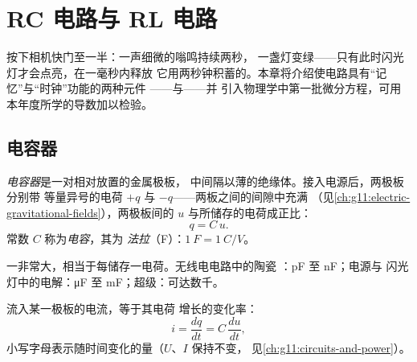 \chapter{RC 电路与 RL 电路}\label{ch:g12:rc-rl-circuits}

按下相机快门至一半：一声细微的嗡鸣持续两秒，
一盏灯变绿——只有此时闪光灯才会点亮，在一毫秒内释放
它用两秒钟积蓄的。本章将介绍使电路具有“记忆”与“时钟”功能的两种元件
——与——并
引入物理学中第一批微分方程，可用本年度所学的导数加以检验。

\section{电容器}

\begin{definition}[电容器与电容]\label{def:g12:rc-rl-circuits:capacitor}
\emph{电容器}是一对相对放置的金属极板，
中间隔以薄的绝缘体。接入电源后，两极板分别带
等量异号的电荷 $+q$ 与 $-q$——两板之间的间隙中充满
（见\cref{ch:g11:electric-gravitational-fields}），两极板间的 $u$
与所储存的电荷成正比：
\[ q = C\,u . \]
常数 $C$ 称为\emph{电容}，其为
\emph{法拉}（\unit{F}）：$\qty{1}{F} = \qty{1}{C/V}$。
\end{definition}

\begin{example}[数量级]\label{ex:g12:rc-rl-circuits:orders}
一非常大，相当于每储存一电荷。无线电电路中的陶瓷
：\unit{pF} 至 \unit{nF}；电源与
闪光灯中的电解：\unit{\micro F} 至 \unit{mF}；超级：可达数千。
\end{example}

\begin{proposition}[流入电容器的电流]\label{prop:g12:rc-rl-circuits:cdudt}
流入某一极板的电流，等于其电荷
增长的变化率：
\[
i = \frac{dq}{dt} = C\,\frac{du}{dt} ,
\]
小写字母表示随时间变化的量（$U$、$I$ 保持不变，
见\cref{ch:g11:circuits-and-power}）。
\end{proposition}

